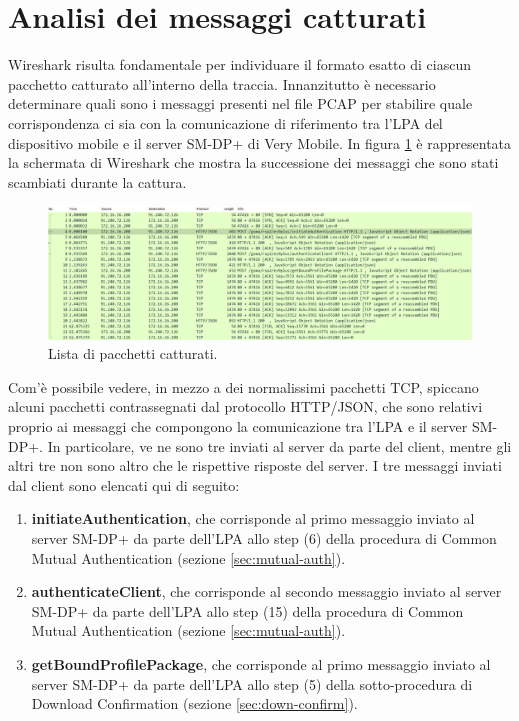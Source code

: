 \documentclass[10pt, oneside]{book}
\begin{document}
\section{Analisi dei messaggi catturati}
Wireshark risulta fondamentale per individuare il formato esatto di ciascun pacchetto catturato all'interno della traccia. Innanzitutto è necessario determinare quali sono i messaggi presenti nel file PCAP per stabilire quale corrispondenza ci sia con la comunicazione di riferimento tra l'LPA del dispositivo mobile e il server SM-DP+ di Very Mobile. In figura \ref{fig:all-msgs-pcap} è rappresentata la schermata di Wireshark che mostra la successione dei messaggi che sono stati scambiati durante la cattura.\\
\begin{figure}
\includegraphics[width=\linewidth]{all-msgs-pcap.png}
\caption{Lista di pacchetti catturati.}
\label{fig:all-msgs-pcap}
\end{figure}
Com'è possibile vedere, in mezzo a dei normalissimi pacchetti TCP, spiccano alcuni pacchetti contrassegnati dal protocollo HTTP/JSON, che sono relativi proprio ai messaggi che compongono la comunicazione tra l'LPA e il server SM-DP+. In particolare, ve ne sono tre inviati al server da parte del client, mentre gli altri tre non sono altro che le rispettive risposte del server. I tre messaggi inviati dal client sono elencati qui di seguito:
\begin{enumerate}
\item \textbf{initiateAuthentication}, che corrisponde al primo messaggio inviato al server SM-DP+ da parte dell'LPA allo step (6) della procedura di Common Mutual Authentication (sezione \ref{sec:mutual-auth}).
\item \textbf{authenticateClient}, che corrisponde al secondo messaggio inviato al server SM-DP+ da parte dell'LPA allo step (15) della procedura di Common Mutual Authentication (sezione \ref{sec:mutual-auth}).
\item \textbf{getBoundProfilePackage}, che corrisponde al primo messaggio inviato al server SM-DP+ da parte dell'LPA allo step (5) della sotto-procedura di Download Confirmation (sezione \ref{sec:down-confirm}).
\end{enumerate}
\end{document}
